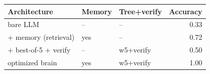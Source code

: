 \begin{tabular}{lll r}
\toprule
Architecture & Memory & Tree+verify & Accuracy \\
\midrule
bare LLM & -- & -- & 0.33 \\
+ memory (retrieval) & yes & -- & 0.72 \\
+ best-of-5 + verify & -- & w5+verify & 0.50 \\
optimized brain & yes & w5+verify & 1.00 \\
\bottomrule
\end{tabular}

